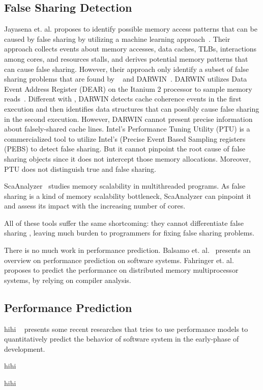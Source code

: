 \subsection{False Sharing Detection}
Jayasena et. al. proposes to identify possible memory access patterns that can be caused by false sharing by utilizing a machine learning approach~\cite{mldetect}. Their approach collects events about memory accesses, data caches, TLBs, interactions among cores, and resources stalls, and derives potential memory patterns that can cause false sharing. However, their approach only identify a subset of false sharing problems that are found by \Predator{}~\cite{Predator} and DARWIN~\cite{openmp}. DARWIN utilizes Data Event Address Register (DEAR) on the Itanium 2 processor to sample memory reads~\cite{Wicaksono11detectingfalse, openmp}. Different with \Cheetah{}, DARWIN detects cache coherence events in the first execution and then identifies data structures that can possibly cause false sharing in the second execution.  However, DARWIN cannot present precise information about falsely-shared cache lines. Intel's Performance Tuning Utility (PTU) is a commercialized tool to utilize Intel's (Precise Event Based Sampling registers (PEBS) to detect false sharing. But it cannot pinpoint the root cause of false sharing objects since it does not intercept those memory allocations. Moreover, PTU does not distinguish true and false sharing. 

ScaAnalyzer~\cite{} studies memory scalability in multithreaded programs. As false sharing is a kind of memory scalability bottleneck, ScaAnalyzer can pinpoint it and assess its impact with the increasing number of cores. 

All of these tools suffer the same shortcoming: they cannot differentiate false sharing , leaving much burden to programmers for fixing false sharing problems. 

There is no much work in performance prediction. Balsamo et. al.~\cite{Balsamo:2004:MPP:987527.987640} presents an overview on performance prediction on software systems. 
Fahringer et. al. proposes to predict the performance on distributed memory multiprocessor systems, by relying on compiler analysis. 

\subsection{Performance Prediction}

hihi ~\cite{Balsamo:2004:MPP:987527.987640} presents some recent researches that tries to use performance models to quantitatively predict the behavior of software system in the early-phase of development. 

hihi ~\cite{impactofsharing}

hihi~\cite{Joao:2012:BIS:2150976.2151001} 


